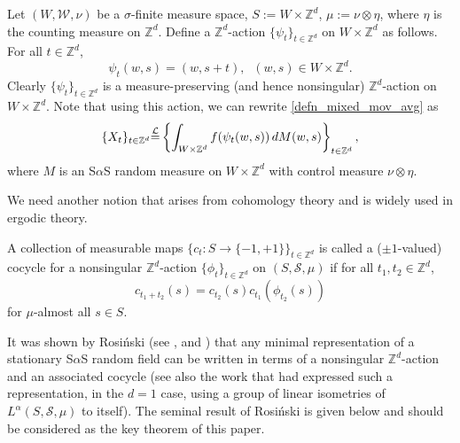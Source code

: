 \documentclass[12pt]{amsart}
\begin{document}
\begin{example}\label{example_action_dissipative_Krengel} \textnormal{Let $(W, \mathcal{W}, \nu)$ be a $\sigma$-finite measure space, $S:=W \times {\mathbb{Z}^d}$, $\mu:=\nu \otimes \eta$, where $\eta$ is the counting measure on ${\mathbb{Z}^d}$. Define a $\mathbb{Z}^d$-action $\{\psi_t\}_{t \in {\mathbb{Z}^d}}$ on $W \times {\mathbb{Z}^d}$ as follows. For all $t \in {\mathbb{Z}^d}$,}
\begin{equation}
\psi_t(w,s)=(w, s+t),\;\; (w,s) \in W \times {\mathbb{Z}^d}.\label{defn_action_dissipative_Krengel}
\end{equation}
\textnormal{Clearly $\{\psi_t\}_{t \in {\mathbb{Z}^d}}$ is a measure-preserving (and hence nonsingular) ${\mathbb{Z}^d}$-action on $W \times {\mathbb{Z}^d}$. Note that using this action, we can rewrite \eqref{defn_mixed_mov_avg} as
\begin{equation}
{\{X_t\}_{t \in \mathbb{Z}^d}} {\stackrel{\footnotesize{\mathcal{L}}}{=}} \left\{\int_{W \times {\mathbb{Z}^d}} f(\psi_t(w,s)) \,dM(w,s)\right\}_{t \in {\mathbb{Z}^d}}, \label{rewrite_mixed_mov_avg_psi_t}
\end{equation}
where $M$ is an S$\alpha$S random measure on $W \times {\mathbb{Z}^d}$ with control measure $\nu \otimes \eta$.}
\end{example}

We need another notion that arises from cohomology theory and is widely used in ergodic theory.

\begin{defn} A collection of measurable maps $\big\{c_t: S \to \{-1, +1\}\big\}_{t \in {\mathbb{Z}^d}}$ is called a ($\pm 1$-valued) cocycle for a nonsingular ${\mathbb{Z}^d}$-action ${\{\phi_t\}_{t \in \mathbb{Z}^d}}$ on $(S, \mathcal{S}, \mu)$ if for all $t_1, t_2 \in{\mathbb{Z}^d}$,
\begin{equation}
c_{t_1 + t_2}(s) = c_{t_2}(s) c_{t_1}(\phi_{t_2}(s)) \label{defn_cocyle}
\end{equation}
for $\mu$-almost all $s \in S$.
\end{defn}

It was shown by Rosi\'{n}ski (see \cite{rosinski:1994}, \cite{rosinski:1995} and \cite{rosinski:2000}) that any minimal representation of a stationary S$\alpha$S random field can be written in terms of a nonsingular ${\mathbb{Z}^d}$-action and an associated cocycle (see also the work \cite{hardin:1982b} that had expressed such a representation, in the $d=1$ case, using a group of linear isometries of $L^\alpha(S, \mathcal{S}, \mu)$ to itself). The seminal result of Rosi\'{n}ski is given below and should be considered as the key theorem of this paper.
\end{document}
